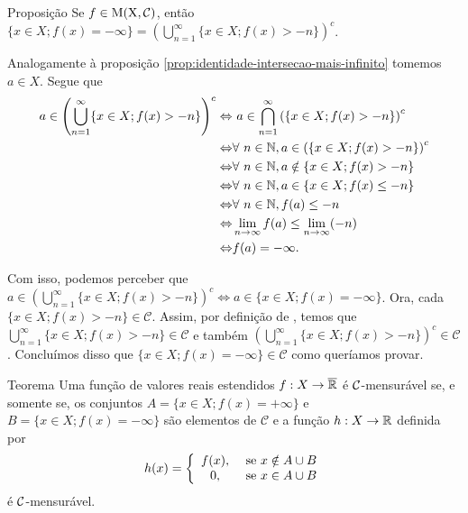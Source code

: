     \begin{env}{Proposição}
    \label{prop:identidade-união-menos-infinito}
        Se $f \in \operatorname{M(X, \mathcal{C} )}$, então $\{x \in X; f(x) = -\infty\} = \displaystyle \left(\bigcup_{n = 1}^\infty \{x \in X; f(x) > - n\}\right)^c$.
        \vspace{-0.4cm}
    \end{env}
    \begin{prova}
    	
    	\vspace{-0.6cm}
        Analogamente à proposição \ref{prop:identidade-intersecao-mais-infinito} tomemos $a \in X$. 
        Segue que 
        \begin{align*}
            a \in \left(\bigcup_{n = 1}^\infty \{x \in X; f(x) > - n\}\right)^c
            \Leftrightarrow & \ a \in \bigcap_{n = 1}^\infty \left(\{x \in X; f(x) > - n\}\right)^c\\
            \Leftrightarrow & \forall \ n \in \operatorname{\mathbb{N}}, a \in \left(\{x \in X; f(x) > - n\}\right)^c\\
            \Leftrightarrow & \forall \ n \in \operatorname{\mathbb{N}}, a \notin \{x \in X; f(x) > - n\}\\
            \Leftrightarrow & \forall \ n \in \operatorname{\mathbb{N}}, a \in \{x \in X; f(x) \leq - n\}\\    
            \Leftrightarrow & \forall \ n \in \operatorname{\mathbb{N}}, f(a) \leq - n\\
            \Leftrightarrow & \lim_{n \to \infty} f(a) \leq \lim_{n \to \infty} (- n)\\  
            \Leftrightarrow & f(a) = -\infty.                  
        \end{align*}
    
    Com isso, podemos perceber que 
    $\displaystyle a \in \left(\bigcup_{n = 1}^\infty \{x \in X; f(x) > - n\}\right)^c \Leftrightarrow  a \in \{x \in X; f(x) = -\infty\}$.
    Ora, cada $\{x \in X; f(x) > - n\} \in \mathcal{C}$.
    Assim, por definição de \sigal, temos que $ \displaystyle\bigcup_{n = 1}^\infty \{x \in X; f(x) > - n\} \in \mathcal{C}$ e também 
    $\displaystyle\left(\bigcup_{n = 1}^\infty \{x \in X; f(x) > - n\}\right)^c \in \mathcal{C}$.
    Concluímos disso que $\{x \in X; f(x) = -\infty\} \in \mathcal{C}$ como queríamos provar. 
    \end{prova}
    \begin{env}{Teorema}
    \label{teo:condição-de-mensurabilidade}
        Uma função de valores reais estendidos $f: X \to \operatorname{\overline{\mathbb{R}}}$ é $\operatorname{\mathcal{C}}$-mensurável se, e somente se, os conjuntos 
        $A = \{ x \in X; f(x) = +\infty\}$ e $B = \{x \in X; f(x) = -\infty\}$
		 são elementos de $\mathcal{C}$ e a função $h: X \to \mathbb{R}$ definida por
		 \vspace{-0.2cm}
		 $$
		 h(x) = \left\{\begin{array}{cc}
		     f(x), & \textrm{\ se } x \notin A\cup B  \\
		      0,& \textrm{\ se } x \in A\cup B
		 \end{array}\right.
	 	 \vspace{-0.2cm}
		 $$
		 é $\operatorname{\mathcal{C}}$-mensurável.
		 \vspace{-0.2cm}
	 \end{env}
